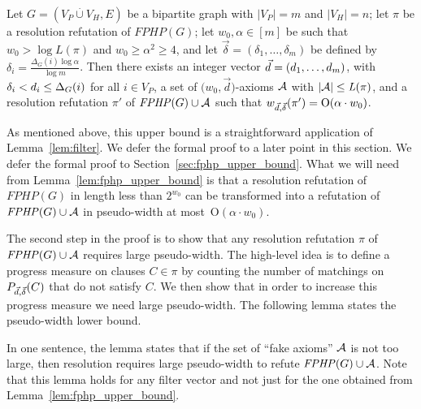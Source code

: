 \documentclass{theoretics}
\makeatletter
\newcommand{\bigoh}[1]{\mathrm{O} ( #1 )}
\newcommand{\N}         {\mathbb{N}}
\providecommand{\abs}[1]{\lvert#1\rvert}
\newcommand{\setsize}[1]{\lvert#1\rvert}
\newcommand{\disjointunion}{\overset{.}{\cup}}
\newcommand{\refsec}[1]{Section~\ref{#1}}
\newcommand{\reflem}[1]{Lemma~\ref{#1}}
\newcommand{\refpi}{\pi}
\newcommand{\genericformsmall}[2]{\mathit{#1}( #2 )}
\newcommand{\length}[1]{\genericformsmall{L}{#1}}
\newcommand{\width}[2][]{\genericformsmall{W_{#1}}{#2}}
\newcommand{\formulaformat}[1]{\mathit{#1}}
\newcommand{\graphfphpnot}[1][G]{\formulaformat{FPHP}({#1})}
\newcommand{\GFPHP}{G\text{-}FPHP}
\renewcommand{\GFPHP}{\graphfphpnot[G]}
\renewcommand{\deg}[2][XXXXXXXXXXXX]{\Delta_{#1}(#2)}
\newcommand{\diff}{\xi}
\newcommand{\cdiff}{4}
\newcommand{\GdegMax}{\Delta}
\newcommand{\V}[1][]{V_{#1}}
\newcommand{\Vp}{\V[P]}
\newcommand{\Vh}{\V[H]}
\newcommand{\Ax}{\ensuremath\mathcal{A}}
\newcommand{\thr}[1]{ \ensuremath d_{{#1}} }
\newcommand{\vecthr}{\vec{d}}
\newcommand{\vecthrdef}[1]{\vecthr = \left(\thr{1}, \ldots, \thr{#1}\right)}
\newcommand{\adv}[1]{\delta_{{#1}}}
\newcommand{\vecadv}{\vec{\delta}}
\newcommand{\vecadvdef}[1]{\vecadv = \left(\adv{1}, \ldots, \adv{#1}\right)}
\newcommand{\Pthick}[1]{\ensuremath P_{\vecthr,\vecadv}(#1)}
\newcommand{\fakeaxiom}{$\bigl( w_0, \vecthr \bigr)$-axiom\xspace}
\newcommand{\pseudowidth}{pseudo-width\xspace}
\renewcommand{\width}[1]{\ensuremath w_{\vecthr,\vecadv}( #1 )}
\numberwithin{equation}{section}
\newcommand\IfRestateTF{%
  \ifx\label\thmt@gobble@label %
    \expandafter\@firstoftwo
  \else
    \expandafter\@secondoftwo
  \fi
}
\newcommand{\RestateRemark}{\IfRestateTF{{\normalfont\bfseries (Restated) }}{}}
\makeatother
\begin{document}
\begin{lemma}\label{lem:fphp_upper_bound}
  Let $G = (\Vp \disjointunion \Vh, E)$
  be a bipartite graph with
  $\setsize{ \Vp } = m$ and $\setsize{ \Vh } = n$;
  let $\refpi$ be a resolution refutation of $\GFPHP$;
  let $w_0, \alpha \in [m]$ be such that 
  $w_0 > \log \length{\refpi}$ and
  $w_0 \ge \alpha^2 \ge 4$,
  and
  let $\vecadvdef{m}$ be defined by 
  $\adv{i} = \frac{\deg[G]{i} \log \alpha}{\log m}$.
  Then
  there exists 
  an integer vector $\vecthrdef{m}$, with 
  $\adv{i} < \thr{i} \le \deg[G]{i}$ for all 
  $i \in \Vp$, a set of \fakeaxiom{s} $\Ax$
  with 
  $\abs{\Ax} \le \length{\refpi}$, and a resolution refutation 
  $\refpi'$ of $\GFPHP \cup \Ax$ such that
  $\width{\refpi'} = \bigoh{\alpha \cdot w_0}$.
\end{lemma}
As 
mentioned
above, this 
upper bound
is a straightforward application of 
\reflem{lem:filter}. 
{We defer the formal proof to a later point in this section.}
{We defer the formal proof to \refsec{sec:fphp_upper_bound}.}
What we will need from \reflem{lem:fphp_upper_bound} is that a
resolution refutation of $\GFPHP$ in length less than $2^{w_0}$ can be
transformed into a refutation of $\GFPHP \cup \Ax$ in \pseudowidth at
most~$\bigoh{\alpha \cdot w_0}$.

The second step in the proof is to show that 
any resolution 
refutation 
$\refpi$ of $\GFPHP \cup \Ax$
requires large \pseudowidth. The 
high-level 
idea is to define a  progress measure
on clauses $C \in \refpi$
by
counting the number of matchings on $\Pthick{C}$ 
that do not 
satisfy $C$. We then show that in order to increase this progress measure
we need large \pseudowidth.
The following lemma states the \pseudowidth lower bound.

In 
one
sentence, the lemma states that if 
the set of ``fake axioms'' 
$\Ax$ is not too large, 
then resolution requires large \pseudowidth
to refute $\GFPHP \cup \Ax$. Note that this lemma holds for
any filter vector and not just for the one 
obtained
from 
\reflem{lem:fphp_upper_bound}.
\end{document}
